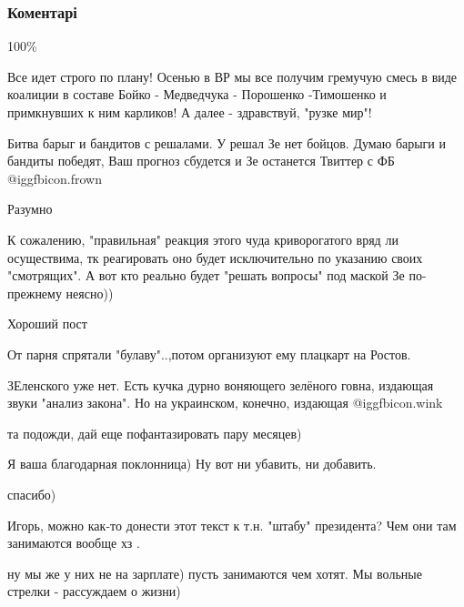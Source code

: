  
 
 
 
 
\subsubsection{Коментарі}
\label{sec:25_04_2019.fb.lesev_igor.1.po_move.cmt}

\begin{itemize} %
100\%

Все идет строго по плану! Осенью в ВР мы все получим гремучую смесь в виде коалиции в составе Бойко - Медведчука - Порошенко -Тимошенко и примкнувших к ним карликов! А далее - здравствуй, "рузке мир"!

Битва барыг и бандитов с решалами.
У решал Зе нет бойцов.
Думаю барыги и бандиты победят, Ваш прогноз сбудется и Зе останется Твиттер с ФБ  @igg{fbicon.frown} 

Разумно

К сожалению, "правильная" реакция этого чуда криворогатого вряд ли осуществима, тк реагировать оно будет исключительно по указанию своих "смотрящих". А вот кто реально будет "решать вопросы" под маской Зе по-прежнему неясно))

Хороший пост

От парня спрятали "булаву"..,потом организуют ему плацкарт на Ростов.

ЗЕленского уже нет. Есть кучка дурно воняющего зелёного говна, издающая звуки "анализ закона". Но на украинском, конечно, издающая  @igg{fbicon.wink} 

та подожди, дай еще пофантазировать пару месяцев)

Я ваша благодарная поклонница)
Ну вот ни убавить, ни добавить.

спасибо)

Игорь, можно как-то донести этот текст к т.н. "штабу" президента? Чем они там занимаются вообще хз .

\begin{itemize} %
ну мы же у них не на зарплате) пусть занимаются чем хотят. Мы вольные стрелки - рассуждаем о жизни)


\end{itemize}
\end{itemize}
